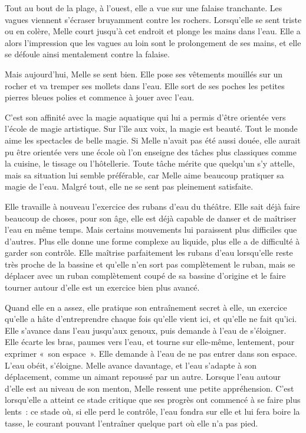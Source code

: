Tout au bout de la plage, à l'ouest, elle a vue sur une falaise tranchante. Les vagues viennent s'écraser bruyamment contre les rochers. Lorsqu'elle se sent triste ou en colère, Melle court jusqu'à cet endroit et plonge les mains dans l'eau. Elle a alors l'impression que les vagues au loin sont le prolongement de ses mains, et elle se défoule ainsi mentalement contre la falaise.

Mais aujourd'hui, Melle se sent bien. Elle pose ses vêtements mouillés sur un rocher et va tremper ses mollets dans l'eau. Elle sort de ses poches les petites pierres bleues polies et commence à jouer avec l'eau.

C'est son affinité avec la magie aquatique qui lui a permis d'être orientée vers l'école de magie artistique. Sur l'île aux voix, la magie est beauté. Tout le monde aime les spectacles de belle magie. Si Melle n'avait pas été aussi douée, elle aurait pu être orientée vers une école où l'on enseigne des tâches plus classiques comme la cuisine, le tissage ou l'hôtellerie. Toute tâche mérite que quelqu'un s'y attelle, mais sa situation lui semble préférable, car Melle aime beaucoup pratiquer sa magie de l'eau. Malgré tout, elle ne se sent pas pleinement satisfaite.

Elle travaille à nouveau l'exercice des rubans d'eau du théâtre. Elle sait déjà faire beaucoup de choses, pour son âge, elle est déjà capable de danser et de maîtriser l'eau en même temps. Mais certains mouvements lui paraissent plus difficiles que d'autres. Plus elle donne une forme complexe au liquide, plus elle a de difficulté à garder son contrôle. Elle maîtrise parfaitement les rubans d'eau lorsqu'elle reste très proche de la bassine et qu'elle n'en sort pas complètement le ruban, mais se déplacer avec un ruban complètement coupé de sa bassine d'origine et le faire tourner autour d'elle est un exercice bien plus avancé.

Quand elle en a assez, elle pratique son entraînement secret à elle, un exercice qu'elle a hâte d'entreprendre chaque fois qu'elle vient ici, et qu'elle ne fait qu'ici. Elle s'avance dans l'eau jusqu'aux genoux, puis demande à l'eau de s'éloigner. Elle écarte les bras, paumes vers l'eau, et tourne sur elle-même, lentement, pour exprimer «~son espace~». Elle demande à l'eau de ne pas entrer dans son espace. L'eau obéit, s'éloigne. Melle avance davantage, et l'eau s'adapte à son déplacement, comme un aimant repoussé par un autre. Lorsque l'eau autour d'elle est au niveau de son menton, Melle ressent une petite appréhension. C'est lorsqu'elle a atteint ce stade critique que ses progrès ont commencé à se faire plus lents~: ce stade où, si elle perd le contrôle, l'eau fondra sur elle et lui fera boire la tasse, le courant pouvant l'entraîner quelque part où elle n'a pas pied.

